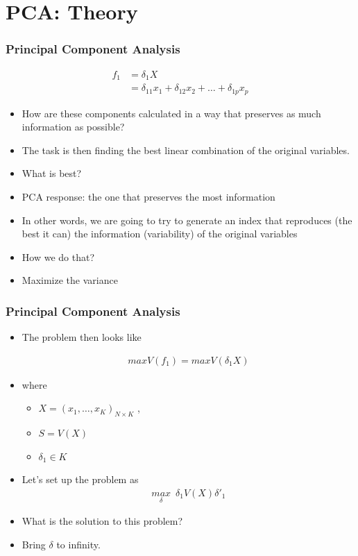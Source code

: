 \documentclass[
  shownotes,
  xcolor={svgnames},
  hyperref={colorlinks,citecolor=DarkBlue,linkcolor=DarkRed,urlcolor=DarkBlue}
  , aspectratio=169]{beamer}
\begin{document}
\section{PCA: Theory}
\begin{frame}
\frametitle{Principal Component Analysis}

\begin{align}
f_1 &= \delta_1 X \\
    &= \delta_{11} x_1+ \delta_{12} x_2 + \dots + \delta_{1p} x_p
\end{align}


\begin{itemize}
  \item How are these components calculated in a way that preserves as much information as possible?
  \medskip
  \item The task is then finding the best linear combination of the original variables.
  \medskip
  \item What is best?
  \medskip
  \pause
  \item PCA response: the one that preserves the most information
  \medskip
  \item In other words, we are going to try to generate an index that reproduces (the best it can) the information (variability) of the original variables
  \medskip
  \item How we do that?
  \pause
  \medskip
  \item Maximize the variance

\end{itemize}   
\end{frame}
\begin{frame}
\frametitle{Principal Component Analysis}

\begin{itemize}
  \item The problem then looks like

  \begin{align}
  max V(f_1) = max V(\delta_1 X)
  \end{align}

  \item where
  \begin{itemize}
    \item $X = (x_1 , \dots , x_K)_{N \times K}$  , 
    \item $S = V(X)$ 
    \item $\delta_1 \in K$
 \end{itemize}
  \item Let's set up the problem as 
  \begin{align}
  \underset{\delta}{max}\,\,\, \delta_1 V(X) \delta'_1
  \end{align}

  \item What is the solution to this problem?

 \pause
  \item Bring $\delta$ to infinity. 
 
\end{itemize}
 \end{frame}
\end{document}
